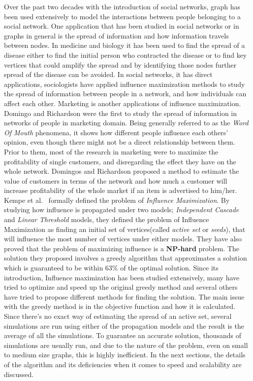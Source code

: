 \documentclass[english]{tktltiki}
\begin{document}
Over the past two decades with the introduction of social networks, graph has been used extensively to model the interactions between people belonging to a social network. One application that has been studied in social networks or in graphs in general is the spread of information and how information travels between nodes. In medicine and biology it has been used to find the spread of a disease either to find the initial person who contracted the disease or to find key vertices that could amplify the spread and by identifying those nodes further spread of the disease can be avoided. In social networks, it has direct applications, sociologists have applied influence maximization methods to study the spread of information between people in a network, and how individuals can affect each other. Marketing is another applications of influence maximization.  Domingo and Richardson \cite{domingo01} were the first to study the spread of information in networks of people in marketing domain. Being generally referred to as the \textit{Word Of Mouth} phenomena, it shows how different people influence each others' opinion, even though there might not be a direct relationship between them. Prior to them, most of the research in marketing were to maximize the profitability of single customers, and disregarding the effect they have on the whole network. Domingos and Richardson proposed a method to estimate the value of customers in terms of the network and how much a customer will increase profitability of the whole market if an item is advertised to him/her. Kempe et al.\ \cite{kempe03} formally defined the problem of \textit{Influence Maximization}. By studying how influence is propagated under two models; \textit{Independent Cascade} and \textit{Linear Threshold} models, they defined the problem of Influence Maximization as finding an initial set of vertices(called \textit{active set} or \textit{seeds}), that will influence the most number of vertices under either models. They have also proved that the problem of maximizing influence is a \textbf{NP-hard} problem. The solution they proposed involves a greedy algorithm that approximates a solution which is guaranteed to be within 63\%  of the optimal solution. Since its introduction, Influence maximization has been studied extensively, many have tried to optimize and speed up the original greedy method and several others have tried to propose different methods for finding the solution. The main issue with the greedy method is in the objective function and how it is calculated. Since there's no exact way of estimating the spread of an active set, several simulations are run using either of the propagation models and the result is the average of all the simulations. To guarantee an accurate solution, thousands of simulations are usually run, and due to the nature of the problem, even on small to medium size graphs, this is highly inefficient. In the next sections, the details of the algorithm and its deficiencies when it comes to speed and scalability are discussed. \\
\end{document}
